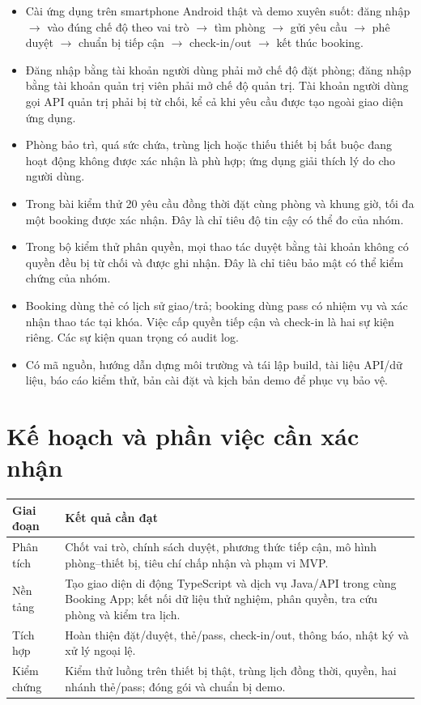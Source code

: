 \documentclass[12pt,a4paper]{article}
\begin{document}
\begin{itemize}[leftmargin=1.6em,itemsep=2pt,topsep=2pt]
  \item Cài ứng dụng trên smartphone Android thật và demo xuyên suốt: đăng nhập $\rightarrow$ vào đúng chế độ theo vai trò $\rightarrow$ tìm phòng $\rightarrow$ gửi yêu cầu $\rightarrow$ phê duyệt $\rightarrow$ chuẩn bị tiếp cận $\rightarrow$ check-in/out $\rightarrow$ kết thúc booking.
  \item Đăng nhập bằng tài khoản người dùng phải mở chế độ đặt phòng; đăng nhập bằng tài khoản quản trị viên phải mở chế độ quản trị. Tài khoản người dùng gọi API quản trị phải bị từ chối, kể cả khi yêu cầu được tạo ngoài giao diện ứng dụng.
  \item Phòng bảo trì, quá sức chứa, trùng lịch hoặc thiếu thiết bị bắt buộc đang hoạt động không được xác nhận là phù hợp; ứng dụng giải thích lý do cho người dùng.
  \item Trong bài kiểm thử 20 yêu cầu đồng thời đặt cùng phòng và khung giờ, tối đa một booking được xác nhận. Đây là chỉ tiêu độ tin cậy có thể đo của nhóm.
  \item Trong bộ kiểm thử phân quyền, mọi thao tác duyệt bằng tài khoản không có quyền đều bị từ chối và được ghi nhận. Đây là chỉ tiêu bảo mật có thể kiểm chứng của nhóm.
  \item Booking dùng thẻ có lịch sử giao/trả; booking dùng pass có nhiệm vụ và xác nhận thao tác tại khóa. Việc cấp quyền tiếp cận và check-in là hai sự kiện riêng. Các sự kiện quan trọng có audit log.
  \item Có mã nguồn, hướng dẫn dựng môi trường và tái lập build, tài liệu API/dữ liệu, báo cáo kiểm thử, bản cài đặt và kịch bản demo để phục vụ bảo vệ.
\end{itemize}

\section{Kế hoạch và phần việc cần xác nhận}

\begin{tabularx}{\textwidth}{|p{2.3cm}|Y|}
  \hline
  \textbf{Giai đoạn} & \textbf{Kết quả cần đạt} \\
  \hline
  Phân tích & Chốt vai trò, chính sách duyệt, phương thức tiếp cận, mô hình phòng--thiết bị, tiêu chí chấp nhận và phạm vi MVP. \\
  \hline
  Nền tảng & Tạo giao diện di động TypeScript và dịch vụ Java/API trong cùng Booking App; kết nối dữ liệu thử nghiệm, phân quyền, tra cứu phòng và kiểm tra lịch. \\
  \hline
  Tích hợp & Hoàn thiện đặt/duyệt, thẻ/pass, check-in/out, thông báo, nhật ký và xử lý ngoại lệ. \\
  \hline
  Kiểm chứng & Kiểm thử luồng trên thiết bị thật, trùng lịch đồng thời, quyền, hai nhánh thẻ/pass; đóng gói và chuẩn bị demo. \\
  \hline
\end{tabularx}
\end{document}
